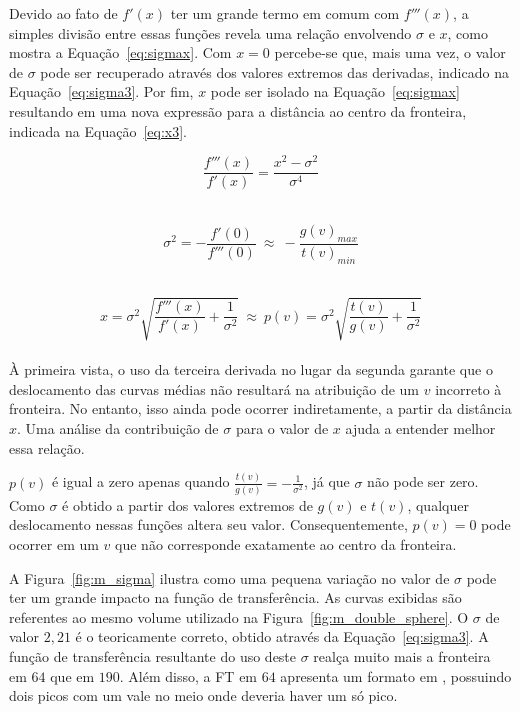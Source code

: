 	Devido ao fato de $ f'(x) $ ter um grande termo em comum com $ f'''(x) $, a simples divisão entre essas funções revela uma relação envolvendo $ \sigma $ e $ x $, como mostra a Equação~\eqref{eq:sigmax}. Com $ x = 0 $ percebe-se que, mais uma vez, o valor de $ \sigma $ pode ser recuperado através dos valores extremos das derivadas, indicado na Equação~\eqref{eq:sigma3}. Por fim, $ x $ pode ser isolado na Equação~\eqref{eq:sigmax} resultando em uma nova expressão para a distância ao centro da fronteira, indicada na Equação~\eqref{eq:x3}.

\begin{equation} \label{eq:sigmax}
	\frac{f'''(x)}{f'(x)} = \frac{x^{2} - \sigma^{2}}{\sigma^{4}}
\end{equation} \

\begin{equation} \label{eq:sigma3}
	\sigma^{2} = -\frac{f'(0)}{f'''(0)} \ \approx \ -\frac{g(v)_{max}}{t(v)_{min}}
\end{equation} \

\begin{equation} \label{eq:x3}
	x = \sigma^{2}\sqrt{\frac{f'''(x)}{f'(x)} + \frac{1}{\sigma^{2}}} \ \approx \ 
	p(v) = \sigma^{2}\sqrt{\frac{t(v)}{g(v)} + \frac{1}{\sigma^{2}}}
\end{equation} \\

	À primeira vista, o uso da terceira derivada no lugar da segunda garante que o deslocamento das curvas médias não resultará na atribuição de um $ v $ incorreto à fronteira. No entanto, isso ainda pode ocorrer indiretamente, a partir da distância $ x $. Uma análise da contribuição de $ \sigma $ para o valor de $ x $ ajuda a entender melhor essa relação.
	
	$ p(v) $ é igual a zero apenas quando $ \frac{t(v)}{g(v)} = -\frac{1}{\sigma^{2}} $, já que $ \sigma $ não pode ser zero. Como $ \sigma $ é obtido a partir dos valores extremos de $ g(v) $ e $ t(v) $, qualquer deslocamento nessas funções altera seu valor. Consequentemente, $ p(v) = 0 $ pode ocorrer em um $ v $ que não corresponde exatamente ao centro da fronteira. 
	
	A Figura~\ref{fig:m_sigma} ilustra como uma pequena variação no valor de $ \sigma $ pode ter um grande impacto na função de transferência. As curvas exibidas são referentes ao mesmo volume utilizado na Figura~\ref{fig:m_double_sphere}. O $ \sigma $ de valor $ 2,21 $ é o teoricamente correto, obtido através da Equação~\eqref{eq:sigma3}. A função de transferência resultante do uso deste $ \sigma $ realça muito mais a fronteira em $ 64 $ que em $ 190 $. Além disso, a FT em $ 64 $ apresenta um formato em , possuindo dois picos com um vale no meio onde deveria haver um só pico.
	
